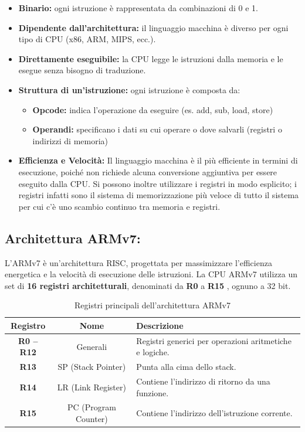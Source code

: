 \documentclass[8pt]{article}
\begin{document}
\vspace{0.2cm}
\begin{itemize}[left=1em, itemsep=0.5em]
    \item \textbf{Binario:} ogni istruzione è rappresentata da combinazioni di 0 e 1.
    \item \textbf{Dipendente dall’architettura:} il linguaggio macchina è diverso per ogni tipo di CPU (x86, ARM, MIPS, ecc.).
    \item \textbf{Direttamente eseguibile:} la CPU legge le istruzioni dalla memoria e le esegue senza bisogno di traduzione.
    \item \textbf{Struttura di un’istruzione:} ogni istruzione è composta da:
	\begin{itemize}[left=1em, itemsep=0.3em]
   		 \item \textbf{Opcode:} indica l’operazione da eseguire (es. add, sub, load, store)
    		\item \textbf{Operandi:} specificano i dati su cui operare o dove salvarli (registri o indirizzi di memoria)
	\end{itemize}
    \item \textbf{Efficienza e Velocità:}  Il linguaggio macchina è il più efficiente in termini di esecuzione, poiché non richiede alcuna conversione aggiuntiva per essere eseguito dalla CPU. Si possono inoltre utilizzare i registri in modo esplicito; i registri infatti sono il sistema di memorizzazione più veloce di tutto il sistema per cui c’è uno scambio continuo tra memoria e registri.
\end{itemize}

\subsection{\Large Architettura ARMv7:}

L'ARMv7 è un'architettura RISC, progettata per massimizzare l'efficienza energetica e la velocità di esecuzione delle istruzioni. 
La CPU ARMv7 utilizza un set di \textbf{16 registri architetturali}, denominati da \textbf{R0} a \textbf{R15} , ognuno a 32 bit.

\vspace{0.5cm}
\begin{table}[h!]
\centering
\caption{Registri principali dell’architettura ARMv7}
\setlength{\tabcolsep}{10pt}
\renewcommand{\arraystretch}{1.3}
\begin{tabular}{|c|c|p{7cm}|}
\hline
\textbf{Registro} & \textbf{Nome} & \textbf{Descrizione} \\ \hline
\textbf{R0 – R12} & Generali & Registri generici per operazioni aritmetiche e logiche. \\ \hline
\textbf{R13} & SP (Stack Pointer) & Punta alla cima dello stack. \\ \hline
\textbf{R14} & LR (Link Register) & Contiene l’indirizzo di ritorno da una funzione. \\ \hline
\textbf{R15} & PC (Program Counter) & Contiene l’indirizzo dell’istruzione corrente. \\ \hline
\end{tabular}
\end{table}
\end{document}
